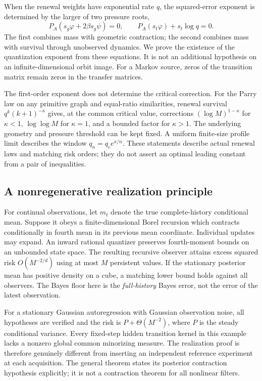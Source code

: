 When the renewal weights have exponential rate $q$, the squared-error
exponent is determined by the larger of two pressure roots,
\[
 P_A(s_g\varphi+2\beta s_g\psi)=0,
 \qquad P_A(s_t\varphi)+s_t\log q=0.
\]
The first combines mass with geometric contraction; the second
combines mass with survival through unobserved dynamics. We prove the
existence of the quantization exponent from these equations. It is
not an additional hypothesis on an infinite-dimensional orbit image.
For a Markov source, zeros of the transition matrix remain zeros in
the transfer matrices.

The first-order exponent does not determine the critical correction.
For the Parry law on any primitive graph and equal-ratio similarities,
renewal survival $q^k(k+1)^{-\kappa}$ gives, at the common critical
value, corrections $(\log M)^{1-\kappa}$ for $\kappa<1$,
$\log\log M$ for $\kappa=1$, and a bounded factor for $\kappa>1$.
The underlying geometry and pressure threshold can be kept fixed.
A uniform finite-size profile limit describes the window
$q_n=q_c e^{x/n}$. These statements describe actual renewal laws and
matching risk orders; they do not assert an optimal leading constant
from a pair of inequalities.

\subsection{A nonregenerative realization principle}
For continual observations, let $m_t$ denote the true complete-history
conditional mean. Suppose it obeys a finite-dimensional Borel recursion
which contracts conditionally in fourth mean in its previous mean
coordinate. Individual updates may expand. An inward rational
quantizer preserves fourth-moment bounds on an unbounded state space.
The resulting recursive observer attains excess squared risk
$O(M^{-2/d})$ using at most $M$ persistent values. If the stationary
posterior mean has positive density on a cube, a matching lower bound
holds against all observers. The Bayes floor here is the
\emph{full-history} Bayes error, not the error of the latest observation.

For a stationary Gaussian autoregression with Gaussian observation
noise, all hypotheses are verified and the risk is
$P+\Theta(M^{-2})$, where $P$ is the steady conditional variance.
Every fixed-step hidden transition kernel in this example lacks a
nonzero global common minorizing measure. The realization proof is
therefore genuinely different from inserting an independent
reference experiment at each acquisition. The general theorem states
its posterior contraction hypothesis explicitly; it is not a
contraction theorem for all nonlinear filters.

